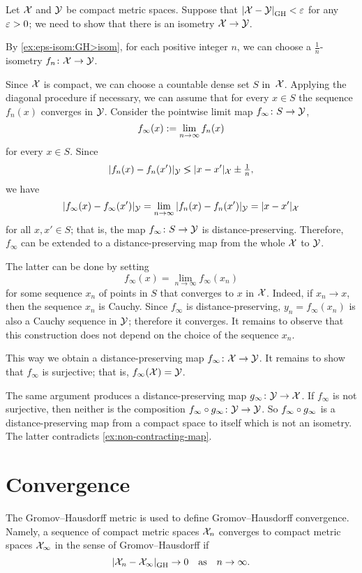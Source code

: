 \label{page:GH-2-proof}
Let $\mathcal{X}$ and $\mathcal{Y}$ be compact metric spaces.
Suppose that $\dist{\spc{X}}{\spc{Y}}{\GH}<\eps$ for any $\varepsilon>0$;
we need to show that there is an isometry $\mathcal{X}\to\mathcal{Y}$.

By \ref{ex:eps-isom:GH>isom}, for each positive integer $n$, we can choose a $\tfrac1n$-isometry $f_n\colon\mathcal{X}\to\mathcal{Y}$.

Since $\mathcal{X}$ is compact, 
we can choose a countable dense set
$S$ in~$\mathcal{X}$.
Applying the diagonal procedure if necessary, we can assume that for every $x \in S$ the sequence $f_n(x)$ 
converges in $\mathcal{Y}$. 
Consider the pointwise limit map  $f_\infty \colon S \to \mathcal{Y}$,
 $$f_\infty(x) \mathrel{:=} \lim_{n\to\infty} f_n (x)$$ for every $x \in S$. 
Since $$|f_n (x)- f_n (x')|_{\spc{Y}}\lg |x- x'|_\spc{X} \pm\tfrac1n,$$ 
we have 
$$|f_\infty(x)-f_\infty (x')|_{\mathcal{Y}} 
= \lim_{n\to\infty} |f_n(x)-f_n (x')|_{\mathcal{Y}} 
= |x -x'|_{\mathcal{X}}$$ for all
$x, x' \in S$; 
that is, the map $f_\infty\colon S\to \mathcal{Y}$ is distance-preserving. 
Therefore, $f_\infty$ can be extended to a distance-preserving map from the whole $\mathcal{X}$ to $\mathcal{Y}$.

The latter can be done by setting 
$$f_\infty(x)=\lim_{n\to\infty} f_\infty(x_n)$$ 
for some sequence $x_n$ of points  in $S$
that converges to $x$ in $\mathcal{X}$.
Indeed, if $x_n\to x$, then the sequence $x_n$ is Cauchy.
Since $f_\infty$ is distance-preserving, $y_n=f_\infty(x_n)$ is also a Cauchy sequence in $\mathcal{Y}$;
therefore it converges.
It remains to observe that this construction does not depend on the choice of the sequence $x_n$.

This way we obtain a distance-preserving map $f_\infty\colon\mathcal{X}\to \mathcal{Y}$. 
It remains to show that $f_\infty$ is surjective; that is, $f_\infty(\mathcal{X})=\mathcal{Y}$.

The same argument produces a distance-preserving map $g_\infty\:\spc{Y}\z\to \spc{X}$.
If $f_\infty$ is not surjective, then neither is the composition $f_\infty\z\circ g_\infty\:\spc{Y}\to \spc{Y}$.
So $f_\infty \z\circ g_\infty$ is a distance-preserving map from a compact space to itself which is not an isometry.
The latter contradicts \ref{ex:non-contracting-map}. 
\qeds

\section{Convergence}

The Gromov--Hausdorff metric is used to define Gromov--Hausdorff convergence.
Namely, a sequence of compact metric spaces $\mathcal{X}_n$ converges to compact metric spaces $\mathcal{X}_\infty$ in the sense of Gromov--Hausdorff if 
\[\dist{\spc{X}_n}{\spc{X}_\infty}{\GH}\to 0\quad\text{as}\quad n\to\infty.\]


